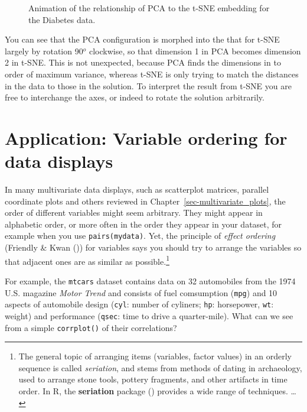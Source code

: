 \documentclass[
  letterpaper,
  10pt,
  krantz2]{krantz}
\begin{document}
{\begin{figure}[H]
{}

\caption{\label{fig-diabetes-pca-tsne-anim-100}Animation of the
relationship of PCA to the t-SNE embedding for the Diabetes data.}

\end{figure}%

You can see that the PCA configuration is morphed into the that for
t-SNE largely by rotation 90\(^o\) clockwise, so that dimension 1 in PCA
becomes dimension 2 in t-SNE. This is not unexpected, because PCA finds
the dimensions in to order of maximum variance, whereas t-SNE is only
trying to match the distances in the data to those in the solution. To
interpret the result from t-SNE you are free to interchange the axes, or
indeed to rotate the solution arbitrarily.

\section{Application: Variable ordering for data
displays}\label{sec-var-order}

In many multivariate data displays, such as scatterplot matrices,
parallel coordinate plots and others reviewed in
Chapter~\ref{sec-multivariate_plots}, the order of different variables
might seem arbitrary. They might appear in alphabetic order, or more
often in the order they appear in your dataset, for example when you use
\texttt{pairs(mydata)}. Yet, the principle of \emph{effect ordering}
(Friendly \& Kwan ()) for
variables says you should try to arrange the variables so that adjacent
ones are as similar as possible.\footnote{The general topic of arranging
  items (variables, factor values) in an orderly sequence is called
  \emph{seriation}, and stems from methods of dating in archaeology,
  used to arrange stone tools, pottery fragments, and other artifacts in
  time order. In R, the \textbf{seriation} package
  () provides a wide
  range of techniques. \ldots{}}

For example, the \texttt{mtcars} dataset contains data on 32 automobiles
from the 1974 U.S. magazine \emph{Motor Trend} and consists of fuel
comsumption (\texttt{mpg}) and 10 aspects of automobile design
(\texttt{cyl}: number of cyliners; \texttt{hp}: horsepower, \texttt{wt}:
weight) and performance (\texttt{qsec}: time to drive a quarter-mile).
What can we see from a simple \texttt{corrplot()} of their correlations?

}
\end{document}
